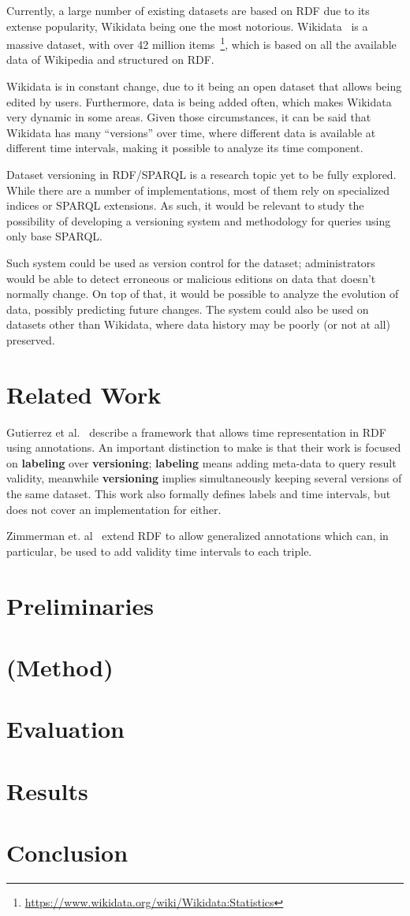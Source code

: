 \documentclass{llncs}
\begin{document}
Currently, a large number of existing datasets are based on RDF due to its extense popularity, Wikidata being one the most notorious. Wikidata~\cite{VrandecicK14} is a massive dataset, with over 42 million items~\footnote{\url{https://www.wikidata.org/wiki/Wikidata:Statistics}}, which is based on all the available data of Wikipedia and structured on RDF.


Wikidata is in constant change, due to it being an open dataset that allows being edited by users. Furthermore, data is being added often, which makes Wikidata very dynamic in some areas. Given those circumstances, it can be said that Wikidata has many ``versions'' over time, where different data is available at different time intervals, making it possible to analyze its time component.


Dataset versioning in RDF/SPARQL is a research topic yet to be fully explored. While there are a number of implementations, most of them rely on specialized indices or SPARQL extensions. As such, it would be relevant to study the possibility of developing a versioning system and methodology for queries using only base SPARQL.


Such system could be used as version control for the dataset; administrators would be able to detect erroneous or malicious editions on data that doesn't normally change. On top of that, it would be possible to analyze the evolution of data, possibly predicting future changes. The system could also be used on datasets other than Wikidata, where data history may be poorly (or not at all) preserved.

\section{Related Work}
Gutierrez et al.~\cite{GutierrezHV07} describe a framework that allows time representation in RDF using annotations. An important distinction to make is that their work is focused on \textbf{labeling} over \textbf{versioning}; \textbf{labeling} means adding meta-data to query result validity, meanwhile \textbf{versioning} implies simultaneously keeping several versions of the same dataset. This work also formally defines labels and time intervals, but does not cover an implementation for either.


Zimmerman et. al~\cite{DBLP:journals/ws/ZimmermannLPS12} extend RDF to allow generalized annotations which can, in particular, be used to add validity time intervals to each triple.
\section{Preliminaries} %
\section{(Method)} %
\section{Evaluation} %
\section{Results}    %
\section{Conclusion}
\newpage


\end{document}
